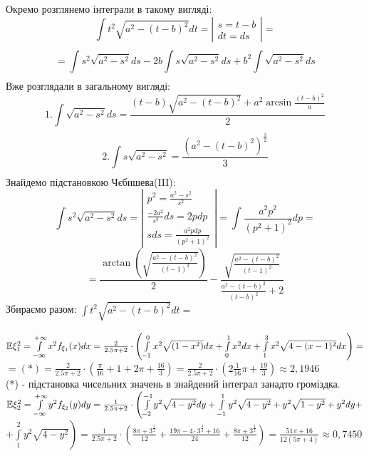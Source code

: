 \documentclass[14pt,a4paper]{scrartcl}
\theoremstyle{definition}
\theoremstyle{remark}
\theoremstyle{definition}
\theoremstyle{definition}
\begin{document}
Окремо розглянемо інтеграли в такому вигляді:
$$
 \int\limits_{}^{ }{t^2 \sqrt{a^2 - (t-b)^2}dt} = \left| \begin{gathered}
s = t-b\\
dt = ds
 \end{gathered} \right|=
$$
$$
=\int\limits_{}^{}{s^2 \sqrt{a^2 - s^2}ds} - 2b  \int\limits_{}^{}{ s \sqrt{a^2 - s^2}ds} + b^2  \int\limits_{}^{}{ \sqrt{a^2 - s^2}ds}
$$
Вже розглядали в загальному вигляді:
$$1. \int\limits_{}^{}{ \sqrt{a^2 - s^2}ds} =  \frac{(t-b) \sqrt{a^2 - (t-b)^2} + a^2 \arcsin{ \frac{(t-b)^2}{a} } }{2} $$
$$
 2.\int\limits_{}^{}{s \sqrt{a^2 - s^2}} = 	\frac{(a^2 - (t-b)^2)^{ \frac{3}{2} 	}} {3}
$$
Знайдемо підстановкою Чєбишева(III):
$$
 \int\limits_{}^{}{ s^2 \sqrt{a^2 -s^2}ds} = \left| \begin{gathered}
  p^2 =  \frac{a^2 - s^2 }{s^2} \\
	\frac{-2a^2}{s^3}ds = 2pdp \\
	sds = \frac{a^2 pdp }{ (p^2 +1)^2}
 \end{gathered} \right|  =  \int\limits_{}^{}{ \frac{a^2p^2}{(p^2 + 1)^2}dp } =
$$
$$
=\frac{\arctan{\left( \sqrt{\frac{a^2 - (t-b)^2}{(t-1)^2}}  \right) }}{2} - \frac{\sqrt{\frac{a^2 - (t-b)^2}{(t-1)^2}}  }{\frac{a^2 - (t-b)^2}{(t-b)^2}+ 2  }
$$
Збираємо разом: \qquad
$
\int\limits_{}^{ }{t^2 \sqrt{a^2 - (t-b)^2}dt} =$\\ 


$\mathbb{E} \xi_1^2  =  \int\limits_{-\infty}^{ +\infty}{ x^2  f_{\xi_1} (x)dx} = \frac{2}{2.5\pi + 2}\cdot \left( \int\limits_{-1}^{0}{ x^2\sqrt{(1-x^2)}dx} +  \int\limits_{0}^{ 1}{x^2dx} +  \int\limits_{1}^{ 3}{x^2\sqrt{4 - (x-1)^2}dx} \right) =$\\
$= (*) = \frac{2}{2.5\pi + 2}\cdot \left(\frac{\pi}{16} +  1 + 2 \pi + \frac{16}{3} \right) = \frac{2}{2.5\pi + 2}\cdot \left(2\frac{1}{16}\pi + \frac{19}{3}\right)  \approx  2,1946 $\\
(*) - підстановка чисельних значень в знайдений інтеграл занадто громіздка.\\
$\mathbb{E}\xi_2^2 =   \int\limits_{- \infty}^{ +\infty}{ y^2 f_{\xi_2} (y) dy} =\frac{1}{2.5\pi + 2} \cdot \left(  \int\limits_{-2}^{ -1}{  y^2\sqrt{4 - y^2}dy}  +  \int\limits_{-1}^{ 1}{ y^2 \sqrt{4 - y^2} + y^2\sqrt{1-y^2}+ y^2 dy}  +\right. $\\$ \left. +   \int\limits_{1}^{ 2}{y^2 \sqrt{4 - y^2}}\right)  = \frac{1}{2.5\pi + 2} \cdot \left(\frac{8{\pi}+3^\frac{3}{2}}{12} + \frac{19{\pi}-4{\cdot}3^\frac{3}{2}+16}{24} + \frac{8{\pi}+3^\frac{3}{2}}{12} \right) = \frac{51\pi + 16}{12(5\pi +4)} \approx 0,7450 $
\end{document}

